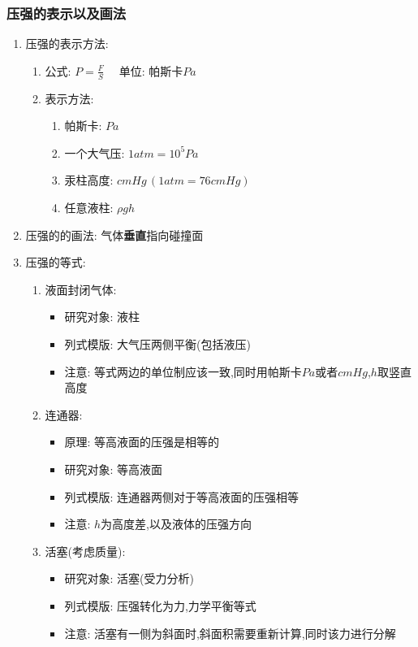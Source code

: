 \documentclass{article}
\begin{document}
\subsubsection{压强的表示以及画法}
\begin{enumerate}
    \item 压强的表示方法:
    \begin{enumerate}[label = (\arabic*)]
        \item 公式: $P = \frac{F}{S} \quad $ 单位: 帕斯卡$Pa$ 
        \item 表示方法: 
        \begin{enumerate}
            \item 帕斯卡: $Pa$
            \item 一个大气压: $1atm = 10^{5}Pa$
            \item 汞柱高度: $cmHg \,  (1atm = 76cmHg)$
            \item 任意液柱: $\rho gh$
        \end{enumerate}
    \end{enumerate}
    \item 压强的的画法: 气体\textbf{垂直}指向碰撞面
    \item 压强的等式: 
    \begin{enumerate}[label = (\arabic*)]
        \item 液面封闭气体:
        \begin{itemize} 
            \item 研究对象: 液柱
            \item 列式模版: 大气压两侧平衡(包括液压)
            \item 注意: 等式两边的单位制应该一致,同时用帕斯卡$Pa$或者$cmHg$,$h$取竖直高度
        \end{itemize}
        \item 连通器: 
        \begin{itemize}
            \item 原理: 等高液面的压强是相等的
            \item 研究对象: 等高液面
            \item 列式模版: 连通器两侧对于等高液面的压强相等
            \item 注意: $h$为高度差,以及液体的压强方向
        \end{itemize}
        \item 活塞(考虑质量):
        \begin{itemize}
            \item 研究对象: 活塞(受力分析)
            \item 列式模版: 压强转化为力,力学平衡等式
            \item 注意: 活塞有一侧为斜面时,斜面积需要重新计算,同时该力进行分解
        \end{itemize}
    \end{enumerate} 
    
\end{enumerate}
\end{document}
